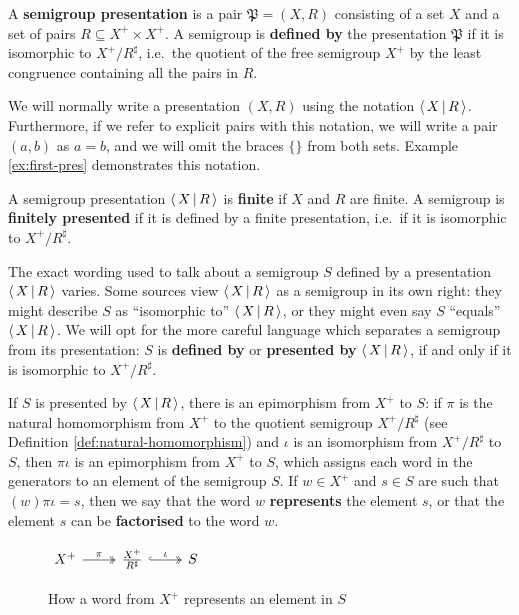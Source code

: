 \begin{definition}
  \label{def:presentation}
  A \textbf{semigroup presentation} is a pair $\mathfrak{P} = (X, R)$
  consisting of a set $X$ and a set of pairs $R \subseteq X^+ \times X^+$.  A
  semigroup is \textbf{defined by} the presentation $\mathfrak{P}$ if it is
  isomorphic to
  $X^+ / R^\sharp$, i.e.~the quotient of the free semigroup $X^+$ by the least
  congruence containing all the pairs in $R$.
\end{definition}

We will normally write a presentation $(X,R)$ using the notation $\left\langle \, X \, \middle| \, R \, \right\rangle$.
Furthermore, if we refer to explicit pairs with this notation, we will write a
pair $(a,b)$ as $a = b$, and we will omit the braces $\{\}$ from both sets.
Example \ref{ex:first-pres} demonstrates this notation.

\begin{definition}
  \label{def:finite-presentation}
  A semigroup presentation $\left\langle \, X \, \middle| \, R \, \right\rangle$ is \textbf{finite} if $X$ and $R$ are
  finite.  A semigroup is \textbf{finitely presented} if it is defined by a
  finite presentation, i.e.~if it is isomorphic to $X^+ / R^\sharp$.
\end{definition}

The exact wording used to talk about a semigroup $S$ defined by a presentation
$\left\langle \, X \, \middle| \, R \, \right\rangle$ varies.  Some sources view $\left\langle \, X \, \middle| \, R \, \right\rangle$ as a semigroup in its own
right: they might describe $S$ as ``isomorphic to'' $\left\langle \, X \, \middle| \, R \, \right\rangle$, or they might
even say $S$ ``equals'' $\left\langle \, X \, \middle| \, R \, \right\rangle$.  We will opt for the more careful language
which separates a semigroup from its presentation: $S$ is \textbf{defined by}  or
\textbf{presented by}  $\left\langle \, X \, \middle| \, R \, \right\rangle$, if and only if it is isomorphic to
$X^+ / R^\sharp$.

If $S$ is presented by $\left\langle \, X \, \middle| \, R \, \right\rangle$, there is an epimorphism from $X^+$ to $S$:
if $\pi$ is the natural homomorphism from $X^+$ to the quotient semigroup
$X^+ / R^\sharp$ (see Definition \ref{def:natural-homomorphism}) and $\iota$ is
an isomorphism from $X^+ / R^\sharp$ to $S$, then $\pi\iota$ is an epimorphism
from $X^+$ to $S$, which assigns each word in the generators to an element of
the semigroup $S$.  If $w \in X^+$ and $s \in S$ are such that
$(w)\pi\iota = s$, then we say that the word $w$ \textbf{represents}  the element
$s$, or that the element $s$ can be \textbf{factorised}  to the word $w$.

\begin{figure}[ht]
  \centering
  $
  \begin{tikzcd}
    X^+ \ar[r, two heads, "\pi"] &
    \frac{X^+}{R^\sharp} \ar[r, two heads, hook, "\iota"] &
    S
  \end{tikzcd}
  $
  \caption[How a word represents a finitely presented semigroup element]{How a
    word from $X^+$ represents an element in $S$}
  \label{fig:word-represents-element}
\end{figure}

